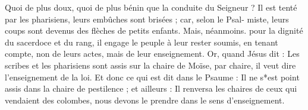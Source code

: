 Quoi de plus doux, quoi de plus bénin que la conduite du Seigneur ? Il est tenté par les pharisiens, leurs embûches sont brisées ; car, selon le Psal- miste, leurs coups sont devenus des flèches de petits enfants. Mais, néanmoins. pour la dignité du sacerdoce et du rang, il engage le peuple à leur rester soumis, en tenant compte, non de leurs actes, mais de leur enseignement. Or, quand Jésus dit : Les scribes et les pharisiens sont assis sur la chaire de Moïse, par chaire, il veut dire l’enseignement de la loi. Et donc ce qui est dit dans le Psaume : Il ne s*est point assis dans la chaire de pestilence ; et ailleurs : Il renversa les chaires de ceux qui vendaient des colombes, nous devons le prendre dans le sens d’enseignement.
